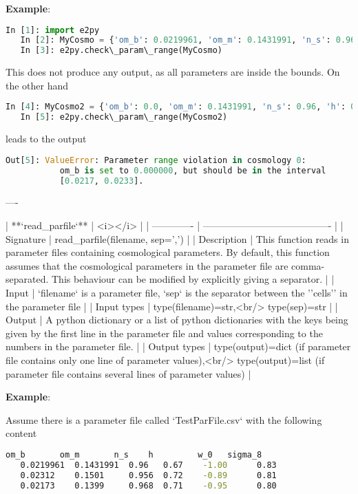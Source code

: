 \documentclass[american,11pt]{article}
\begin{document}
\textbf{Example}: 

\begin{lstlisting}[language=python]
   In [1]: import e2py
   In [2]: MyCosmo = {'om_b': 0.0219961, 'om_m': 0.1431991, 'n_s': 0.96, 'h': 0.67, 'w_0': -1.0, 'sigma_8': 0.83}
   In [3]: e2py.check\_param\_range(MyCosmo)
\end{lstlisting}

This does not produce any output, as all parameters are inside the bounds. On the other hand

\begin{lstlisting}[language=python]
   In [4]: MyCosmo2 = {'om_b': 0.0, 'om_m': 0.1431991, 'n_s': 0.96, 'h': 0.67, 'w_0': -1.0, 'sigma_8': 0.83}
   In [5]: e2py.check\_param\_range(MyCosmo2)
\end{lstlisting}

leads to the output

\begin{lstlisting}[language=python]
   Out[5]: ValueError: Parameter range violation in cosmology 0: 
           om_b is set to 0.000000, but should be in the interval      
           [0.0217, 0.0233].
\end{lstlisting}
----

| **`read\_parfile`** | <i></i> |
| ------------- | ---------------------------------------- |
| Signature | read\_parfile(filename, sep=',') |
| Description | This function reads in parameter files containing cosmological parameters. By default, this function assumes that the cosmological parameters in the parameter file are comma-separated. This behaviour can be modified by explicitly giving a separator. |
| Input | `filename` is a parameter file, `sep` is the separator between the ''cells'' in the parameter file |
| Input types | type(filename)=str,<br/> type(sep)=str |
| Output | A python dictionary or a list of python dictionaries with the keys being given by the first line in the parameter file and values corresponding to the numbers in the parameter file. |
| Output types | type(output)=dict (if parameter file contains only one line of parameter values),<br/> type(output)=list (if parameter file contains several lines of parameter values) |

\textbf{Example}:

Assume there is a parameter file called `TestParFile.csv` with the following content

\begin{lstlisting}[language=bash]
   om_b       om_m       n_s    h         w_0   sigma_8
   0.0219961  0.1431991  0.96   0.67    -1.00      0.83
   0.02312    0.1501     0.956  0.72    -0.89      0.81
   0.02173    0.1399     0.968  0.71    -0.95      0.80
\end{lstlisting}
\end{document}
